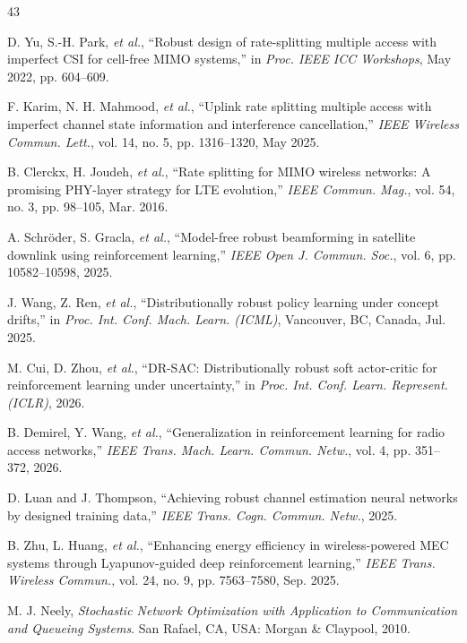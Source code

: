 \documentclass[journal]{IEEEtran}
\begin{document}
\begin{thebibliography}{43}

D. Yu, S.-H. Park, \emph{et al.}, ``Robust design of rate-splitting multiple access with imperfect CSI for cell-free MIMO systems,'' in \emph{Proc. IEEE ICC Workshops}, May 2022, pp. 604--609.

F. Karim, N. H. Mahmood, \emph{et al.}, ``Uplink rate splitting multiple access with imperfect channel state information and interference cancellation,'' \emph{IEEE Wireless Commun. Lett.}, vol. 14, no. 5, pp. 1316--1320, May 2025.

B. Clerckx, H. Joudeh, \emph{et al.}, ``Rate splitting for MIMO wireless networks: A promising PHY-layer strategy for LTE evolution,'' \emph{IEEE Commun. Mag.}, vol. 54, no. 3, pp. 98--105, Mar. 2016.

A. Schr\"oder, S. Gracla, \emph{et al.}, ``Model-free robust beamforming in satellite downlink using reinforcement learning,'' \emph{IEEE Open J. Commun. Soc.}, vol. 6, pp. 10582--10598, 2025.

J. Wang, Z. Ren, \emph{et al.}, ``Distributionally robust policy learning under concept drifts,'' in \emph{Proc. Int. Conf. Mach. Learn. (ICML)}, Vancouver, BC, Canada, Jul. 2025.

M. Cui, D. Zhou, \emph{et al.}, ``DR-SAC: Distributionally robust soft actor-critic for reinforcement learning under uncertainty,'' in \emph{Proc. Int. Conf. Learn. Represent. (ICLR)}, 2026.

B. Demirel, Y. Wang, \emph{et al.}, ``Generalization in reinforcement learning for radio access networks,'' \emph{IEEE Trans. Mach. Learn. Commun. Netw.}, vol. 4, pp. 351--372, 2026.

D. Luan and J. Thompson, ``Achieving robust channel estimation neural networks by designed training data,'' \emph{IEEE Trans. Cogn. Commun. Netw.}, 2025.

B. Zhu, L. Huang, \emph{et al.}, ``Enhancing energy efficiency in wireless-powered MEC systems through Lyapunov-guided deep reinforcement learning,'' \emph{IEEE Trans. Wireless Commun.}, vol. 24, no. 9, pp. 7563--7580, Sep. 2025.

M. J. Neely, \emph{Stochastic Network Optimization with Application to Communication and Queueing Systems}. San Rafael, CA, USA: Morgan \& Claypool, 2010.


\end{thebibliography}
\end{document}
